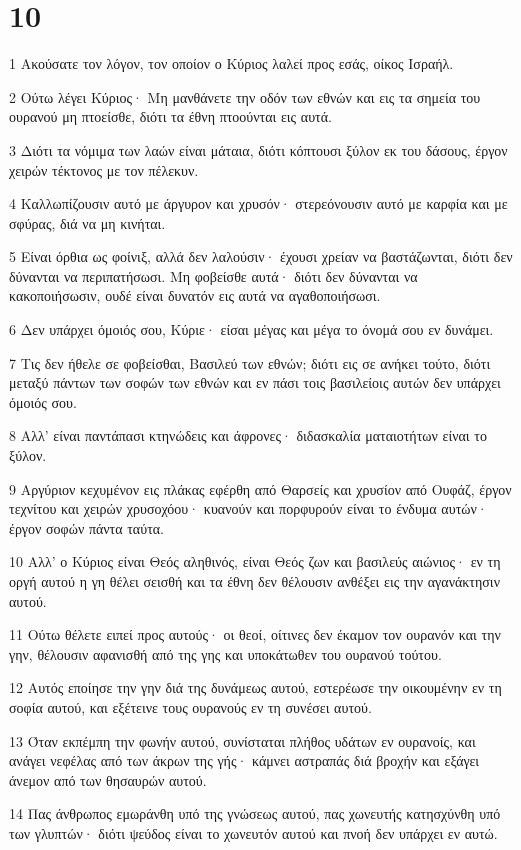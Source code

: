 \chapter{10}

\par 1 Ακούσατε τον λόγον, τον οποίον ο Κύριος λαλεί προς εσάς, οίκος Ισραήλ.
\par 2 Ούτω λέγει Κύριος· Μη μανθάνετε την οδόν των εθνών και εις τα σημεία του ουρανού μη πτοείσθε, διότι τα έθνη πτοούνται εις αυτά.
\par 3 Διότι τα νόμιμα των λαών είναι μάταια, διότι κόπτουσι ξύλον εκ του δάσους, έργον χειρών τέκτονος με τον πέλεκυν.
\par 4 Καλλωπίζουσιν αυτό με άργυρον και χρυσόν· στερεόνουσιν αυτό με καρφία και με σφύρας, διά να μη κινήται.
\par 5 Είναι όρθια ως φοίνιξ, αλλά δεν λαλούσιν· έχουσι χρείαν να βαστάζωνται, διότι δεν δύνανται να περιπατήσωσι. Μη φοβείσθε αυτά· διότι δεν δύνανται να κακοποιήσωσιν, ουδέ είναι δυνατόν εις αυτά να αγαθοποιήσωσι.
\par 6 Δεν υπάρχει όμοιός σου, Κύριε· είσαι μέγας και μέγα το όνομά σου εν δυνάμει.
\par 7 Τις δεν ήθελε σε φοβείσθαι, Βασιλεύ των εθνών; διότι εις σε ανήκει τούτο, διότι μεταξύ πάντων των σοφών των εθνών και εν πάσι τοις βασιλείοις αυτών δεν υπάρχει όμοιός σου.
\par 8 Αλλ' είναι παντάπασι κτηνώδεις και άφρονες· διδασκαλία ματαιοτήτων είναι το ξύλον.
\par 9 Αργύριον κεχυμένον εις πλάκας εφέρθη από Θαρσείς και χρυσίον από Ουφάζ, έργον τεχνίτου και χειρών χρυσοχόου· κυανούν και πορφυρούν είναι το ένδυμα αυτών· έργον σοφών πάντα ταύτα.
\par 10 Αλλ' ο Κύριος είναι Θεός αληθινός, είναι Θεός ζων και βασιλεύς αιώνιος· εν τη οργή αυτού η γη θέλει σεισθή και τα έθνη δεν θέλουσιν ανθέξει εις την αγανάκτησιν αυτού.
\par 11 Ούτω θέλετε ειπεί προς αυτούς· οι θεοί, οίτινες δεν έκαμον τον ουρανόν και την γην, θέλουσιν αφανισθή από της γης και υποκάτωθεν του ουρανού τούτου.
\par 12 Αυτός εποίησε την γην διά της δυνάμεως αυτού, εστερέωσε την οικουμένην εν τη σοφία αυτού, και εξέτεινε τους ουρανούς εν τη συνέσει αυτού.
\par 13 Όταν εκπέμπη την φωνήν αυτού, συνίσταται πλήθος υδάτων εν ουρανοίς, και ανάγει νεφέλας από των άκρων της γής· κάμνει αστραπάς διά βροχήν και εξάγει άνεμον από των θησαυρών αυτού.
\par 14 Πας άνθρωπος εμωράνθη υπό της γνώσεως αυτού, πας χωνευτής κατησχύνθη υπό των γλυπτών· διότι ψεύδος είναι το χωνευτόν αυτού και πνοή δεν υπάρχει εν αυτώ.
